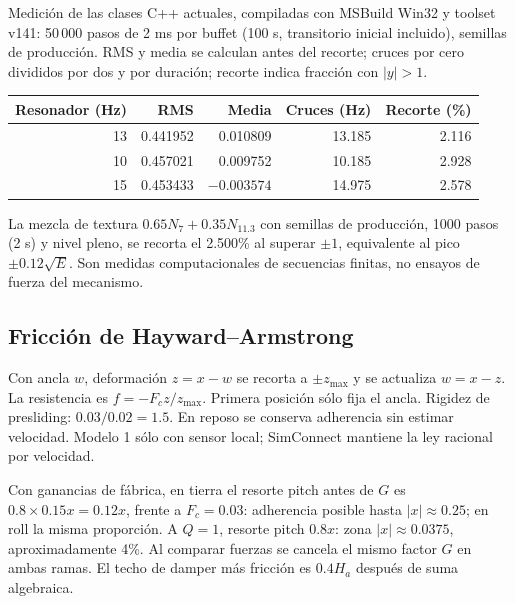 \documentclass[11pt,a4paper]{article}
\begin{document}
Medición de las clases C++ actuales, compiladas con MSBuild Win32 y toolset v141: 50\,000 pasos de 2 ms por buffet (100 s, transitorio inicial incluido), semillas de producción. RMS y media se calculan antes del recorte; cruces por cero divididos por dos y por duración; recorte indica fracción con $|y|>1$.
\begin{center}\begin{tabular}{rrrrr}
\toprule Resonador (Hz)&RMS&Media&Cruces (Hz)&Recorte (\%)\\\midrule
13&0.441952&0.010809&13.185&2.116\\
10&0.457021&0.009752&10.185&2.928\\
15&0.453433&$-0.003574$&14.975&2.578\\
\bottomrule\end{tabular}\end{center}
La mezcla de textura $0.65N_7+0.35N_{11.3}$ con semillas de producción, 1000 pasos (2 s) y nivel pleno, se recorta el 2.500\% al superar $\pm1$, equivalente al pico $\pm0.12\sqrt E$. Son medidas computacionales de secuencias finitas, no ensayos de fuerza del mecanismo.


\subsection{Fricción de Hayward--Armstrong}
Con ancla $w$, deformación $z=x-w$ se recorta a $\pm z_{\max}$ y se actualiza $w=x-z$. La resistencia es $f=-F_cz/z_{\max}$. Primera posición sólo fija el ancla. Rigidez de presliding: $0.03/0.02=1.5$. En reposo se conserva adherencia sin estimar velocidad. Modelo 1 sólo con sensor local; SimConnect mantiene la ley racional por velocidad.

Con ganancias de fábrica, en tierra el resorte pitch antes de $G$ es $0.8\times0.15x=0.12x$, frente a $F_c=0.03$: adherencia posible hasta $|x|\approx0.25$; en roll la misma proporción. A $Q=1$, resorte pitch $0.8x$: zona $|x|\approx0.0375$, aproximadamente 4\%. Al comparar fuerzas se cancela el mismo factor $G$ en ambas ramas. El techo de damper más fricción es $0.4H_a$ después de suma algebraica.
\end{document}
